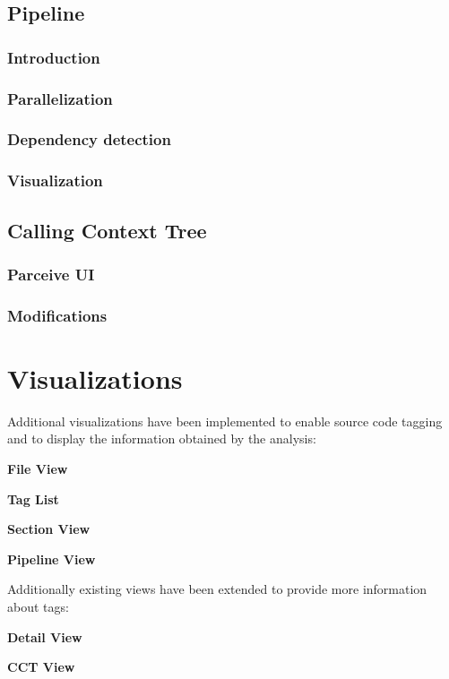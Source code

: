 \subsection{Pipeline}
\subsubsection{Introduction}
\subsubsection{Parallelization}
\subsubsection{Dependency detection}
\subsubsection{Visualization}

\subsection{Calling Context Tree}
\subsubsection{Parceive UI}
\subsubsection{Modifications}

\section{Visualizations}

Additional visualizations have been implemented to enable source code tagging and to display the information obtained by the analysis:

\textbf{File View}

\textbf{Tag List}

\textbf{Section View}

\textbf{Pipeline View}

Additionally existing views have been extended to provide more information about tags:

\textbf{Detail View}

\textbf{CCT View}






